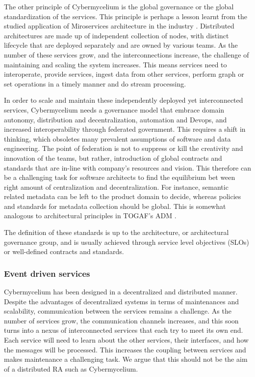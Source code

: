 \documentclass[review]{elsarticle}
\begin{document}
The other principle of Cybermycelium is the global governance or the global standardization of the services. This principle is perhaps a lesson learnt from the studied application of Miroservices architecture in the industry \cite{alshuqayran2016systematic}. Distributed architectures are made up of independent collection of nodes, with distinct lifecycle that are deployed separately and are owned by various teams. As the number of these services grow, and the interconnections increase, the challenge of maintaining and scaling the system increases. This means services need to interoperate, provide services, ingest data from other services, perform graph or set operations in a timely manner and do stream processing.

In order to scale and maintain these independently deployed yet interconnected services, Cybermycelium needs a governance model that embrace domain autonomy, distribution and decentralization, automation and Devops, and increased interoperability through federated government. This requires a shift in thinking, which obsoletes many prevalent assumptions of software and data engineering. The point of federation is not to suppress or kill the creativity and innovation of the teams, but rather, introduction of global contracts and standards that are in-line with company's resources and vision. This therefore can be a challenging task for software architects to find the  equilibrium bet ween right amount of centralization and decentralization. For instance, semantic related metadata can be left to the product domain to decide, whereas policies and standards for metadata collection should be global. This is somewhat analogous to architectural principles in TOGAF's ADM \cite{josey2016togaf}.

The definition of these standards is up to the architecture, or architectural governance group, and is usually achieved through service level objectives (SLOs) or well-defined contracts and standards.

\subsubsection{Event driven services}

Cybermycelium has been designed in a decentralized and distributed manner. Despite the advantages of decentralized systems in terms of maintenances and scalability, communication between the services remains a challenge. As the number of services grow, the communication channels increases, and this soon turns into a nexus of interconnected services that each try to meet its own end. Each service will need to learn about the other services, their interfaces, and how the messages will be processed. This increases the coupling between services and makes maintenance a challenging task. We argue that this should not be the aim of a distributed RA such as Cybermycelium.
\end{document}
